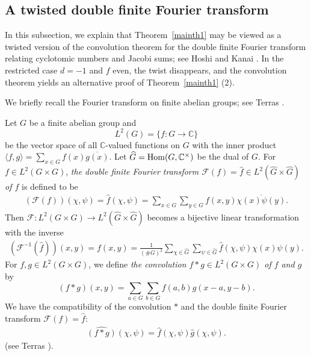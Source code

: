\documentclass[a4paper, 11pt]{amsart}
\newcommand{\C}{\mathbb C}
\theoremstyle{plain}
\theoremstyle{definition}
\numberwithin{equation}{section}
\begin{document}
\subsection{A twisted double finite Fourier transform}
%
In this subsection, we explain that Theorem~\ref{mainth1} may be viewed as a twisted version of the convolution theorem for the double finite Fourier transform relating cyclotomic numbers and Jacobi sums; see Hoshi and Kanai \cite[Section 4]{HK22}. 
In the restricted case $d=-1$ and $f$ even, the twist disappears, and the convolution theorem yields an alternative proof of Theorem~\ref{mainth1} (2).

We briefly recall the Fourier transform on finite abelian groups; see Terras \cite[Chapter 10]{Ter99}.

Let $G$ be a finite abelian group and 
\[
L^2(G) = \{f : G \to \C\}
\]
be the vector space of all $\C$-valued functions on $G$ with 
the inner product 
$\langle f,g\rangle=\sum_{x\in G}f(x)\overline{g(x)}$. 
Let $\widehat{G}={\rm Hom}(G,\C^{\times})$ be the dual 
of $G$. 
For $f\in L^2(G\times G)$, 
{\it the double finite Fourier transform $\mathscr{F}(f)=\widehat{f}\in L^2(\widehat{G}\times \widehat{G})$ of $f$} is defined to be 
\begin{align*}
(\mathscr{F}(f))(\chi, \psi) = \widehat{f}(\chi,\psi) =\sum_{x \in G}\sum_{y \in G} f(x,y)\overline{\chi(x)\psi(y)}.
\end{align*} 
Then $\mathscr{F}:L^2(G\times G)\rightarrow L^2(\widehat{G}\times \widehat{G})$ becomes a 
bijective linear transformation with the inverse 
\begin{align*}
(\mathscr{F}^{-1}(\widehat{f}))(x,y) = f(x,y) 
= \frac{1}{(\# G)^2}\sum_{\chi \in \widehat{G}}\sum_{\psi \in \widehat{G}}\widehat{f}(\chi,\psi)\chi(x)\psi(y).
\end{align*}
For $f, g\in L^2(G\times G)$, we define {\it the convolution $f \ast g\in L^2(G\times G)$ 
of $f$ and $g$} by
\[
(f \ast g)(x,y) =\sum_{a \in G}\sum_{b \in G} f(a,b)g(x-a,y-b).
\]
We have the compatibility of the convolution $\ast$ and 
the double finite Fourier transform $\mathscr{F}(f)=\widehat{f}$: 
\begin{align}\label{eq:comb}
\widehat{(f\ast g)}(\chi, \psi)=\widehat{f}(\chi, \psi)\widehat{g}(\chi, \psi). 
\end{align}
(see Terras \cite[page 168, Theorem~2]{Ter99}). 
\end{document}
